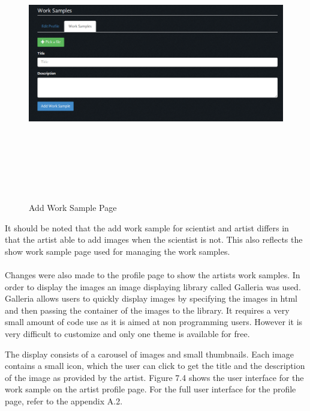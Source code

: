 \documentclass[a4paper,oneside,11pt]{report}
\begin{document}
\begin{figure}[!ht]
\centering
\includegraphics[width=\textwidth,height=12cm,keepaspectratio]{third-iteration-add-worksample-artist.png}
\caption{Add Work Sample Page}
\end{figure}
It should be noted that the add work sample for scientist and artist differs in that the artist able to add images when the scientist is not. This also reflects the show work sample page used for managing the work samples.
\\
\\
Changes were also made to the profile page to show the artists work samples. In order to display the images an image displaying library called Galleria was used. Galleria allows users to quickly display images by specifying the images in html and then passing the container of the images to the library. It requires a very small amount of code use as it is aimed at non programming users. However it is very difficult to customize and only one theme is available for free.

The display consists of a carousel of images and small thumbnails. Each image contains a small icon, which the user can click to get the title and the description of the image as provided by the artist. Figure 7.4 shows the user interface for the work sample on the artist profile page. For the full user interface for the profile page, refer to the appendix A.2.
\end{document}
